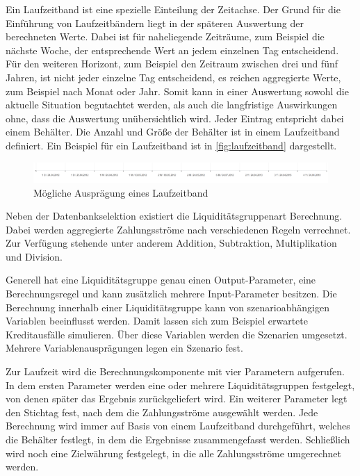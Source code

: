 \begin{onehalfspacing}
Ein Laufzeitband ist eine spezielle Einteilung der Zeitachse. Der Grund für die Einführung von Laufzeitbändern liegt in der späteren Auswertung der berechneten Werte. Dabei ist für naheliegende Zeiträume, zum Beispiel die nächste Woche, der entsprechende Wert an jedem einzelnen Tag entscheidend. Für den weiteren Horizont, zum Beispiel den Zeitraum zwischen drei und fünf Jahren, ist nicht jeder einzelne Tag  entscheidend, es reichen aggregierte Werte, zum Beispiel nach Monat oder Jahr. Somit kann in einer Auswertung sowohl die aktuelle Situation begutachtet werden, als auch die langfristige Auswirkungen ohne, dass die Auswertung unübersichtlich wird. Jeder Eintrag entspricht dabei einem Behälter. Die Anzahl und Größe der Behälter ist in einem Laufzeitband definiert. Ein Beispiel für ein Laufzeitband ist in \vref{fig:laufzeitband} dargestellt.

\begin{figure}[!ht]
\centering
\setlength{\unitlength}{1mm}
\includegraphics[width=15cm]{images/laufzeitband.PNG}
\caption{Mögliche Ausprägung eines Laufzeitband\label{fig:laufzeitband}}
\end{figure} 

Neben der Datenbankselektion existiert die Liquiditätsgruppenart Berechnung. Dabei werden aggregierte Zahlungsströme nach verschiedenen Regeln verrechnet. Zur Verfügung stehende unter anderem Addition, Subtraktion, Multiplikation und Division. 

Generell hat eine Liquiditätsgruppe genau einen Output-Parameter, eine Berechnungsregel und kann zusätzlich mehrere Input-Parameter besitzen. Die Berechnung innerhalb einer Liquiditätsgruppe kann von szenarioabhängigen Variablen beeinflusst werden. Damit lassen sich zum Beispiel erwartete Kreditausfälle simulieren. Über diese Variablen werden die Szenarien umgesetzt. Mehrere Variablenausprägungen legen ein Szenario fest.

\label{sec:berechnungskomponente:parameter}
Zur Laufzeit wird die Berechnungskomponente mit vier Parametern aufgerufen. In dem ersten Parameter werden eine oder mehrere Liquiditätsgruppen festgelegt, von denen später das Ergebnis zurückgeliefert wird. Ein weiterer Parameter legt den Stichtag fest, nach dem die Zahlungsströme ausgewählt werden. Jede Berechnung wird immer auf Basis von einem Laufzeitband durchgeführt, welches die Behälter festlegt, in dem die Ergebnisse zusammengefasst werden. Schließlich wird noch eine Zielwährung festgelegt, in die alle Zahlungsströme umgerechnet werden.


\end{onehalfspacing}
